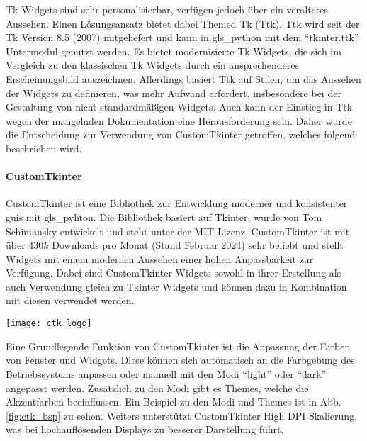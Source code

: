 Tk Widgets sind sehr personalisierbar, verfügen jedoch über ein veraltetes Aussehen. Einen Lösungsansatz bietet dabei Themed Tk (Ttk). Ttk wird seit der Tk Version 8.5 (2007) mitgeliefert und kann in \gls{gls_python} mit dem \enquote{tkinter.ttk} Untermodul genutzt werden. Es bietet modernisierte Tk Widgets, die sich im Vergleich zu den klassischen Tk Widgets durch ein ansprechenderes Erscheinungsbild auszeichnen. Allerdings basiert Ttk  auf Stilen, um das Aussehen der Widgets zu definieren, was mehr Aufwand erfordert, insbesondere bei der Gestaltung von nicht standardmäßigen Widgets. Auch kann der Einstieg in Ttk wegen der mangelnden Dokumentation eine Herausforderung sein. Daher wurde die Entscheidung zur Verwendung von CustomTkinter getroffen, welches folgend beschrieben wird. \cite[vgl.][]{Python_Software_Foundation_Tk:o.J., stackoverflow_tk_ttk:2013}


\paragraph{CustomTkinter}
\begin{minipage}{0.6\textwidth}
	CustomTkinter ist eine Bibliothek zur Entwicklung moderner und konsistenter \acsp{gui} mit \gls{gls_pyhton}. Die Bibliothek basiert auf Tkinter, wurde von Tom Schimansky entwickelt und steht unter der MIT Lizenz. CustomTkinter ist mit über $430k$ Downloads pro Monat (Stand Februar 2024) sehr beliebt und stellt Widgets mit einem modernen Aussehen einer hohen Anpassbarkeit zur Verfügung. Dabei sind CustomTkinter Widgets sowohl in ihrer Erstellung als auch Verwendung gleich zu Tkinter Widgets und können dazu in Kombination mit diesen verwendet werden. \cite[vgl.][]{Schimansky_Git:o.J.}
\end{minipage}%
\hfill
\begin{minipage}{0.37\textwidth}
	\centering	
	\texttt{[image: ctk\_logo]}
\end{minipage}
\vspace{1ex}

Eine Grundlegende Funktion von CustomTkinter ist die Anpassung der Farben von Fenster und Widgets. Diese können sich automatisch an die Farbgebung des Betriebssystems anpassen oder manuell mit den Modi \enquote{light} oder \enquote{dark} angepasst werden. Zusätzlich zu den Modi gibt es Themes, welche die Akzentfarben beeinflussen. Ein Beispiel zu den Modi und Themes ist in Abb. \ref{fig:ctk_bsp} zu sehen. Weiters unterstützt CustomTkinter High DPI Skalierung, was bei hochauflösenden Displays zu besserer Darstellung führt. \cite[vgl.][]{Schimansky_Git:o.J.}

